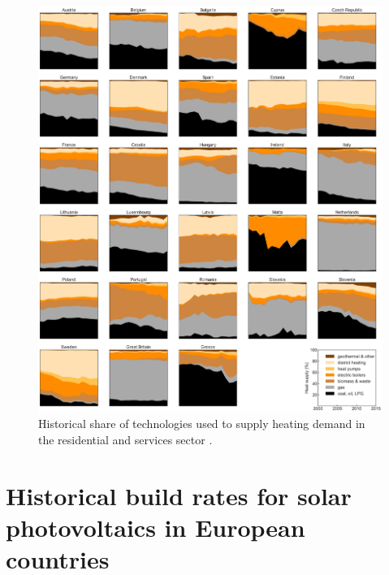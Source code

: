 \documentclass[3p]{elsarticle} %
\begin{document}
\begin{figure}[!h]
\centering
\includegraphics[width=\textwidth]{figures/heating_historical.png}
\caption{Historical share of technologies used to supply heating demand in the residential and services sector \cite{IDEES}. } \label{fig_historical_heating} 
\end{figure}



\FloatBarrier

\newpage

\section{Historical build rates for solar photovoltaics in European countries}
\end{document}
